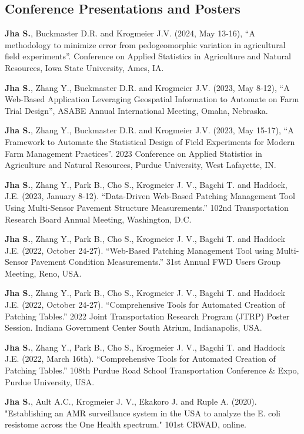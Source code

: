 \documentclass[10pt]{article}
\begin{document}
\subsection{Conference Presentations and Posters}

\begin{description}
\item \textbf{Jha S.}, Buckmaster D.R. and Krogmeier J.V. (2024, May 13-16), “A methodology to minimize error from pedogeomorphic variation in agricultural field experiments”. Conference on Applied Statistics in Agriculture and Natural Resources, Iowa State University, Ames, IA.
\item \textbf{Jha S.}, Zhang Y., Buckmaster D.R. and Krogmeier J.V. (2023, May 8-12), “A Web-Based Application Leveraging Geospatial Information to Automate on Farm Trial Design”, ASABE Annual International Meeting, Omaha, Nebraska.
\item \textbf{Jha S.}, Zhang Y., Buckmaster D.R. and Krogmeier J.V. (2023, May 15-17), “A Framework to Automate the Statistical Design of Field Experiments for Modern Farm Management Practices”. 2023 Conference on Applied Statistics in Agriculture and Natural Resources, Purdue University, West Lafayette, IN.
\item	\textbf{Jha S.}, Zhang Y., Park B., Cho S., Krogmeier J. V., Bagchi T. and Haddock, J.E. (2023, January 8-12). “Data-Driven Web-Based Patching Management Tool Using Multi-Sensor Pavement Structure Measurements.” 102nd Transportation Research Board Annual Meeting, Washington, D.C.
\item	\textbf{Jha S.}, Zhang Y., Park B., Cho S., Krogmeier J. V., Bagchi T. and Haddock J.E. (2022, October 24-27). “Web-Based Patching Management Tool using Multi-Sensor Pavement Condition Measurements.” 31st Annual FWD Users Group Meeting, Reno, USA.
\item	\textbf{Jha S.}, Zhang Y., Park B., Cho S., Krogmeier J. V., Bagchi T. and Haddock J.E. (2022, October 24-27). “Comprehensive Tools for Automated Creation of Patching Tables.” 2022 Joint Transportation Research Program (JTRP) Poster Session. Indiana Government Center South Atrium, Indianapolis, USA.
\item	\textbf{Jha S.}, Zhang Y., Park B., Cho S., Krogmeier J. V., Bagchi T. and Haddock J.E. (2022, March 16th). “Comprehensive Tools for Automated Creation of Patching Tables.” 108th Purdue Road School Transportation Conference \& Expo, Purdue University, USA.
\item	\textbf{Jha S.}, Ault A.C., Krogmeier J. V., Ekakoro J. and Ruple A. (2020). "Establishing an AMR surveillance system in the USA to analyze the E. coli resistome across the One Health spectrum." 101st CRWAD, online.

\end{description}
\end{document}
